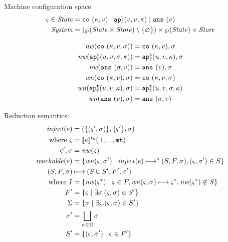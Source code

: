 \documentclass{llncs}
\newcommand{\alt}{\mid}
\begin{document}
Machine configuration space:
\begin{align*}
\mstate \in \State &= \co{\mkont, \mval} \alt
                     \ap[_\mlab^\mcntr]{\mval,\mval,\mkont} \alt
                     \ans{\mval} \\
\System &= (\wp(\State \times \Store) \setminus \setof{\varnothing}) \times \wp(\State) \times \Store
\end{align*}

\begin{align*}
\nw(\co{\mkont,\mval,\msto}) &= \co{\mkont, \mval}, \msto \\
\nw(\ap[^\mcntr_\mlab]{\mvalx{u},\mval,\msto,\mkont}) &= \ap[^\mcntr_\mlab]{\mvalx{u},\mval,\mkont}, \msto \\
\nw(\ans{\msto,\mval}) &= \ans{\mval}, \msto \\
\wn(\co{\mkont,\mval},\msto) &= \co{\mkont,\mval,\msto} \\
\wn(\ap[^\mcntr_\mlab]{\mvalx{u},\mval,\mkont},\msto) &= \ap[^\mcntr_\mlab]{\mvalx{u},\mval,\msto,\mkont} \\
\wn(\ans{\mval},\msto) &= \ans{\msto,\mval}
\end{align*}

Reduction semantics:
\begin{align*}
\inject(\mexp) &= (\setof{\ttuple{\mstate'}{\msto}},\setof{\mstate'},\msto) \\
 \text{ where } \mstate &= \compile{\mexp}^{\mtcntr}(\bot,\bot,\kmt) \\
                \mstate', \msto &= \nw(\mstate) \\
\reachable{\mexp} &= \setof{\wn(\mstate,\msto') \mid
                             \inject(\mexp) \machstep^* (S,F,\msto),
                             \ttuple{\mstate}{\msto'} \in S} \\
(S,F,\msto) &\machstep (S \cup S', F', \msto') \\
 \text{ where }
  I &= \setof{ \nw(\mstate^*) \mid \mstate \in F, \wn(\mstate,\msto) \machstep \mstate^*, \nw(\mstate^*)\notin S} \\
  F' &= \setof{\mstate \mid \exists \msto. \ttuple{\mstate}{\msto} \in S'} \\
  \Sigma &= \setof{\msto \mid \exists \mstate. \ttuple{\mstate}{\msto} \in S'} \\
  \msto' &= \bigsqcup\limits_{\msto\in\Sigma}{\msto} \\
  S' &= \setof{\ttuple{\mstate}{\msto'} \mid \mstate \in F'}
\end{align*}
\end{document}
